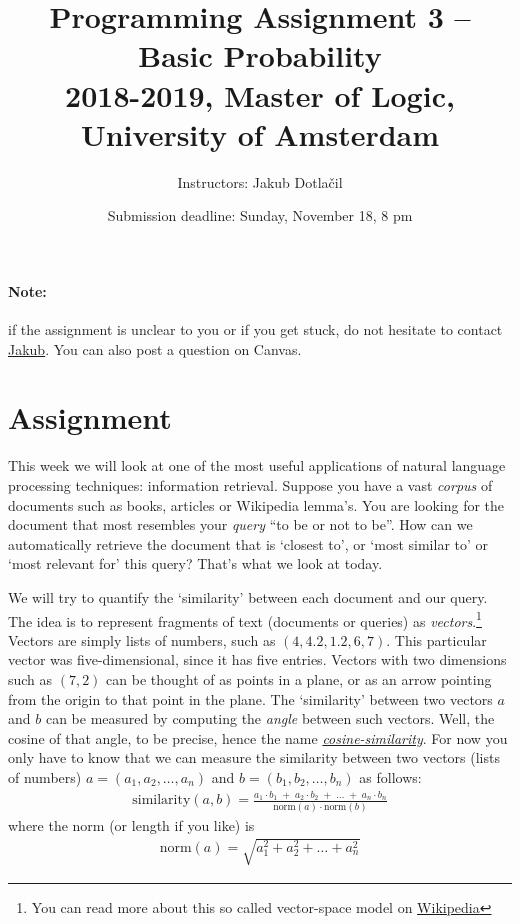 \documentclass[11pt, a4paper]{article}
\title{Programming Assignment 3 -- Basic Probability \\[2mm]
\large{2018-2019, Master of Logic, University of Amsterdam}}
\author{Instructors: Jakub Dotla\v{c}il}
\date{Submission deadline: Sunday, November 18, 8 pm}
\begin{document}
\maketitle

\paragraph{Note:} if the assignment is unclear to you or if you get stuck, do not hesitate to contact \href{mailto:j.dotlacil@uva.nl}{Jakub}. You can also post a question on Canvas.

\section{Assignment}
This week we will look at one of the most useful applications of natural language processing techniques: information retrieval. 
Suppose you have a vast \emph{corpus} of documents such as books, articles or Wikipedia lemma's.
You are looking for the document that most resembles your \emph{query} ``to be or not to be''. 
How can we automatically retrieve the document that is `closest to', or `most similar to' or `most relevant for' this query?
That's what we look at today.



We will try to quantify the `similarity' between each document and our query. 
The idea is to represent fragments of text (documents or queries) as \emph{vectors}.\footnote{You can read more about this so called vector-space model on \href{https://en.wikipedia.org/wiki/Vector_space_model}{Wikipedia}} 
Vectors are simply lists of numbers, such as $(4, 4.2, 1.2, 6, 7)$. 
This particular vector was five-dimensional, since it has five entries. 
Vectors with two dimensions such as $(7, 2)$ can be thought of as points in a plane, or as an arrow pointing from the origin to that point in the plane.
The `similarity' between two vectors $a$ and $b$ can be measured by computing the \emph{angle} between such vectors. 
Well, the cosine of that angle, to be precise, hence the name \emph{\href{https://en.wikipedia.org/wiki/Cosine_similarity}{cosine-similarity}}. 
For now you only have to know that we can measure the similarity between two vectors (lists of numbers) $a=(a_1, a_2, \dots, a_n)$ and $b = (b_1, b_2, \dots, b_n)$ as follows:
\begin{align}
  \text{similarity}(a, b) 
    = \frac{ a_1 \cdot b_1 \;+\; a_2 \cdot b_2 \;+\; \dots \;+\; a_n \cdot b_n}%
      {\text{norm}(a) \cdot \text{norm}(b)}
\end{align}
where the norm (or length if you like) is
\begin{align}
  \text{norm}(a) = \sqrt{a_1^2 + a_2^2 + \dots + a_n^2}
\end{align}
\end{document}
